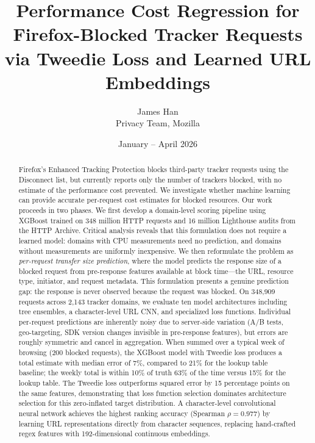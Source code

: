 \documentclass[11pt]{article}
\title{\textbf{Performance Cost Regression for Firefox-Blocked Tracker Requests\\via Tweedie Loss and Learned URL Embeddings}}
\author{James Han\\Privacy Team, Mozilla}
\date{January -- April 2026}
\begin{document}
\maketitle

\begin{abstract}
Firefox's Enhanced Tracking Protection blocks third-party tracker requests using the Disconnect list, but currently reports only the number of trackers blocked, with no estimate of the performance cost prevented. We investigate whether machine learning can provide accurate per-request cost estimates for blocked resources. Our work proceeds in two phases. We first develop a domain-level scoring pipeline using XGBoost trained on 348 million HTTP requests and 16 million Lighthouse audits from the HTTP Archive. Critical analysis reveals that this formulation does not require a learned model: domains with CPU measurements need no prediction, and domains without measurements are uniformly inexpensive. We then reformulate the problem as \emph{per-request transfer size prediction}, where the model predicts the response size of a blocked request from pre-response features available at block time---the URL, resource type, initiator, and request metadata. This formulation presents a genuine prediction gap: the response is never observed because the request was blocked. On 348,909 requests across 2,143 tracker domains, we evaluate ten model architectures including tree ensembles, a character-level URL CNN, and specialized loss functions. Individual per-request predictions are inherently noisy due to server-side variation (A/B tests, geo-targeting, SDK version changes invisible in pre-response features), but errors are roughly symmetric and cancel in aggregation. When summed over a typical week of browsing (200 blocked requests), the XGBoost model with Tweedie loss produces a total estimate with median error of 7\%, compared to 21\% for the lookup table baseline; the weekly total is within 10\% of truth 63\% of the time versus 15\% for the lookup table. The Tweedie loss outperforms squared error by 15 percentage points on the same features, demonstrating that loss function selection dominates architecture selection for this zero-inflated target distribution. A character-level convolutional neural network achieves the highest ranking accuracy (Spearman $\rho = 0.977$) by learning URL representations directly from character sequences, replacing hand-crafted regex features with 192-dimensional continuous embeddings.
\end{abstract}
\end{document}
